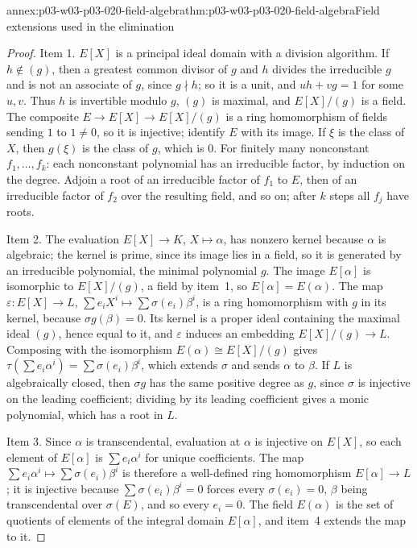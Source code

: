 \begin{annexitem}{annex:p03-w03-p03-020-field-algebra}{thm:p03-w03-p03-020-field-algebra}{Field extensions used in the elimination}
\begin{proof}
Item 1. \(E[X]\) is a principal ideal domain with a division algorithm. If
\(h\notin(g)\), then a greatest common divisor of \(g\) and \(h\) divides the
irreducible \(g\) and is not an associate of \(g\), since \(g\nmid h\); so it
is a unit, and \(uh+vg=1\) for some \(u,v\). Thus \(h\) is invertible modulo
\(g\), \((g)\) is maximal, and \(E[X]/(g)\) is a field. The composite
\(E\to E[X]\to E[X]/(g)\) is a ring homomorphism of fields sending \(1\) to
\(1\ne0\), so it is injective; identify \(E\) with its image. If \(\xi\) is
the class of \(X\), then \(g(\xi)\) is the class of \(g\), which is \(0\).
For finitely many nonconstant \(f_1,\ldots,f_k\): each nonconstant
polynomial has an irreducible factor, by induction on the degree. Adjoin a
root of an irreducible factor of \(f_1\) to \(E\), then of an irreducible
factor of \(f_2\) over the resulting field, and so on; after \(k\) steps
all \(f_j\) have roots.

Item 2. The evaluation \(E[X]\to K\), \(X\mapsto\alpha\), has nonzero kernel
because \(\alpha\) is algebraic; the kernel is prime, since its image lies in
a field, so it is generated by an irreducible polynomial, the minimal
polynomial \(g\). The image \(E[\alpha]\) is isomorphic to \(E[X]/(g)\), a
field by item~1, so \(E[\alpha]=E(\alpha)\). The map
\(\varepsilon:E[X]\to L\), \(\sum e_iX^i\mapsto\sum\sigma(e_i)\beta^i\), is a
ring homomorphism with \(g\) in its kernel, because \(\sigma g(\beta)=0\).
Its kernel is a proper ideal containing the maximal ideal \((g)\), hence
equal to it, and \(\varepsilon\) induces an embedding
\(E[X]/(g)\to L\). Composing with the isomorphism
\(E(\alpha)\cong E[X]/(g)\) gives
\(\tau(\sum e_i\alpha^i)=\sum\sigma(e_i)\beta^i\), which extends \(\sigma\)
and sends \(\alpha\) to \(\beta\). If \(L\) is algebraically closed, then
\(\sigma g\) has the same positive degree as \(g\), since \(\sigma\) is
injective on the leading coefficient; dividing by its leading coefficient
gives a monic polynomial, which has a root in \(L\).

Item 3. Since \(\alpha\) is transcendental, evaluation at \(\alpha\) is
injective on \(E[X]\), so each element of \(E[\alpha]\) is
\(\sum e_i\alpha^i\) for unique coefficients. The map
\(\sum e_i\alpha^i\mapsto\sum\sigma(e_i)\beta^i\) is therefore a well-defined
ring homomorphism \(E[\alpha]\to L\); it is injective because
\(\sum\sigma(e_i)\beta^i=0\) forces every \(\sigma(e_i)=0\), \(\beta\) being
transcendental over \(\sigma(E)\), and so every \(e_i=0\). The field
\(E(\alpha)\) is the set of quotients of elements of the integral domain
\(E[\alpha]\), and item~4 extends the map to it.


\end{proof}
\end{annexitem}
